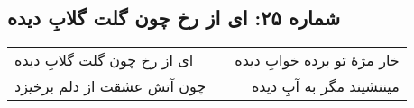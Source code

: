 \begin{center}
\section*{شماره ۲۵: ای از رخ چون گلت گلابِ دیده}
\label{sec:025}
\begin{longtable}{l p{0.5cm} r}
ای از رخ چون گلت گلابِ دیده
&&
خار مژهٔ تو برده خوابِ دیده
\\
چون آتش عشقت از دلم برخیزد
&&
میننشیند مگر به آبِ دیده
\\
\end{longtable}
\end{center}
